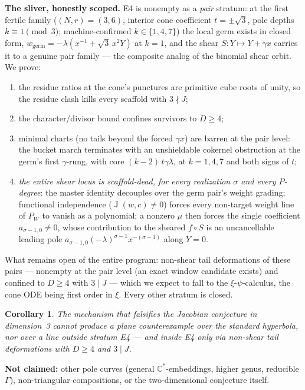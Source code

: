 \documentclass[11pt]{article}
\newtheorem*{corollary*}{Corollary}
\newcommand{\C}{\mathbb{C}}
\newcommand{\J}{\operatorname{J}}
\begin{document}
\textbf{The sliver, honestly scoped.} E4 is nonempty as a \emph{pair}
stratum: at the first fertile family ($(N, r) = (3, 6)$, interior cone
coefficient $t = \pm\sqrt3$, pole depths $k \equiv 1 \pmod 3$;
machine-confirmed $k \in \{1, 4, 7\}$) the local germ exists in closed form,
$w_{\mathrm{germ}} = -\lambda(x^{-1} + \sqrt3\, x^2 Y)$ at $k = 1$, and the
shear $S \colon Y \mapsto Y + \gamma x$ carries it to a genuine pair family
--- the composite analog of the binomial shear orbit. We prove:
\begin{enumerate}
\item the residue ratios at the cone's punctures are primitive cube roots of
unity, so the residue clash kills every scaffold with $3 \nmid J$;
\item the character/divisor bound confines survivors to $D \ge 4$;
\item minimal charts (no tails beyond the forced $\gamma x$) are barren at
the pair level: the bucket march terminates with an unshieldable cokernel
obstruction at the germ's first $\gamma$-rung, with core $(k-2)\,t\gamma\lambda$,
at $k = 1, 4, 7$ and both signs of $t$;
\item \emph{the entire shear locus is scaffold-dead, for every realization
$\sigma$ and every $P$-degree}: the master identity decouples over the germ
pair's weight grading; functional independence ($\J(w,c) \neq 0$) forces
every non-target weight line of $P_W$ to vanish as a polynomial; a nonzero
$\mu$ then forces the single coefficient $a_{\sigma-1,0} \neq 0$, whose
contribution to the sheared $f \circ S$ is an uncancellable leading pole
$a_{\sigma-1,0}(-\lambda)^{\sigma-1} x^{-(\sigma-1)}$ along $Y = 0$.
\end{enumerate}
What remains open of the entire program: non-shear tail deformations of
these pairs --- nonempty at the pair level (an exact window candidate
exists) and confined to $D \ge 4$ with $3 \mid J$ --- which we expect to
fall to the $\xi$-$\psi$-calculus, the cone ODE being first order in $\xi$.
Every other stratum is closed.

\begin{corollary*}
The mechanism that falsifies the Jacobian conjecture in dimension~3 cannot
produce a plane counterexample over the standard hyperbola, nor over a line
outside stratum E4 --- and inside E4 only via non-shear tail deformations
with $D \ge 4$ and $3 \mid J$.
\end{corollary*}

\textbf{Not claimed:} other pole curves (general $\C^{*}$-embeddings, higher
genus, reducible $\Gamma$), non-triangular compositions, or the
two-dimensional conjecture itself.
\end{document}
